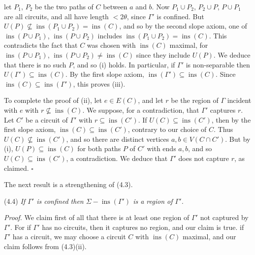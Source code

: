 \noindent let $P_1$, $P_2$ be the two paths of $C$ between $a$ and $b$. Now $P_1 \cup P_2$, $P_2 \cup P$, $P \cup P_1$ are all circuits, and all have length $< 2\theta$, since $\Gamma'$ is confined. But $U(P) \not\subseteq \operatorname{ins}(P_1 \cup P_2) = \operatorname{ins}(C)$, and so by the second slope axiom, one of $\operatorname{ins}(P \cup P_1)$, $\operatorname{ins}(P \cup P_2)$ includes $\operatorname{ins}(P_1 \cup P_2) = \operatorname{ins}(C)$. This contradicts the fact that $C$ was chosen with $\operatorname{ins}(C)$ maximal, for $\operatorname{ins}(P \cup P_1)$, $\operatorname{ins}(P \cup P_2) \ne \operatorname{ins}(C)$ since they include $U(P)$. We deduce that there is no such $P$, and so (i) holds. In particular, if $\Gamma'$ is non-separable then $U(\Gamma') \subseteq \operatorname{ins}(C)$. By the first slope axiom, $\operatorname{ins}(\Gamma') \subseteq \operatorname{ins}(C)$. Since $\operatorname{ins}(C) \subseteq \operatorname{ins}(\Gamma')$, this proves (iii).

To complete the proof of (ii), let $e \in E(C)$, and let $r$ be the region of $\Gamma$ incident with $e$ with $r \not\subseteq \operatorname{ins}(C)$. We suppose, for a contradiction, that $\Gamma'$ captures $r$. Let $C'$ be a circuit of $\Gamma'$ with $r \subseteq \operatorname{ins}(C')$. If $U(C) \subseteq \operatorname{ins}(C')$, then by the first slope axiom, $\operatorname{ins}(C) \subseteq \operatorname{ins}(C')$, contrary to our choice of $C$. Thus $U(C) \not\subseteq \operatorname{ins}(C')$, and so there are distinct vertices $a, b \in V(C \cap C')$. But by (i), $U(P) \subseteq \operatorname{ins}(C)$ for both paths $P$ of $C'$ with ends $a, b$, and so $U(C) \subseteq \operatorname{ins}(C')$, a contradiction. We deduce that $\Gamma'$ does not capture $r$, as claimed. $\square$

The next result is a strengthening of (4.3).

\stmt
(4.4) \textit{If $\Gamma'$ is confined then $\Sigma - \operatorname{ins}(\Gamma')$ is a region of $\Gamma'$.}

\textit{Proof.} We claim first of all that there is at least one region of $\Gamma'$ not captured by $\Gamma'$. For if $\Gamma'$ has no circuits, then it captures no region, and our claim is true. if $\Gamma'$ has a circuit, we may choose a circuit $C$ with $\operatorname{ins}(C)$ maximal, and our claim follows from (4.3)(ii).


